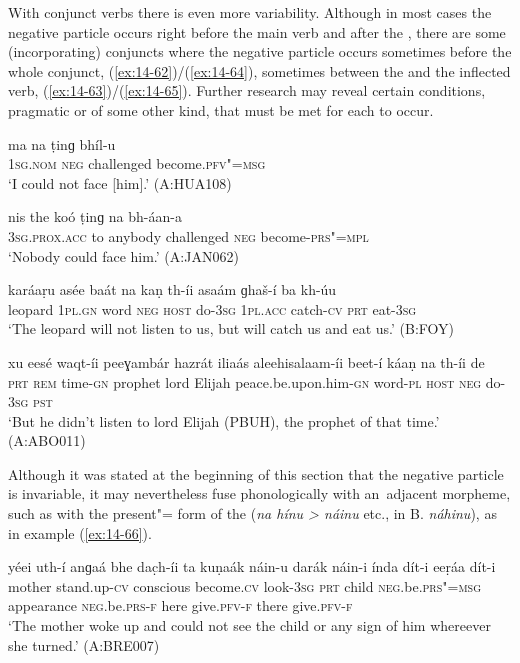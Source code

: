 With conjunct verbs there is even more variability. Although in most cases the negative particle occurs right before the main verb and after the , there are some (incorporating) conjuncts where the negative particle occurs sometimes before the whole conjunct, (\ref{ex:14-62})/(\ref{ex:14-64}), sometimes between the  and the inflected verb, (\ref{ex:14-63})/(\ref{ex:14-65}). Further research may reveal certain conditions, pragmatic or of some other kind, that must be met for each to occur. 

\begin{exe}
\ex
\label{ex:14-62}
\gll ma na ṭinɡ bhíl-u \\
\textsc{1sg.nom} \textsc{neg} challenged become.\textsc{pfv"=msg } \\
\glt `I could not face [him].' (A:HUA108)

\ex
\label{ex:14-63}
\gll nis the koó ṭinɡ na  bh-áan-a \\
\textsc{3sg.prox.acc} to anybody challenged \textsc{neg} become-\textsc{prs"=mpl } \\
\glt `Nobody could face him.' (A:JAN062)

\ex
\label{ex:14-64}
\gll karáaṛu asée baát na kaṇ th-íi asaám ɡhaš-í  ba kh-úu \\
leopard \textsc{1pl.gn} word \textsc{neg} \textsc{host} do-\textsc{3sg} \textsc{1pl.acc} catch-\textsc{cv}  \textsc{prt} eat-\textsc{3sg} \\
\glt `The leopard will not listen to us, but will catch us and eat us.' (B:FOY)

\ex
\label{ex:14-65}
\gll xu eesé waqt-íi peeɣambár hazrát iliaás aleehisalaam-íi  beet-í
káaṇ na th-íi  de \\
\textsc{prt} \textsc{rem} time-\textsc{gn} prophet lord  Elijah peace.be.upon.him-\textsc{gn} word-\textsc{pl} \textsc{host} \textsc{neg} do-\textsc{3sg} \textsc{pst} \\
\glt `But he didn't listen to lord Elijah (PBUH), the prophet of that time.' (A:ABO011)
\end{exe}

Although it was stated at the beginning of this section that the negative particle is invariable, it may nevertheless fuse phonologically with an~adjacent morpheme, such as with the present"= form of the  (\textit{na hínu {\textgreater} náinu} etc., in B. \textit{náhinu}), as in example (\ref{ex:14-66}).

\begin{exe}
\ex
\label{ex:14-66}
\gll yéei uth-í anɡaá bhe dac̣h-íi  ta kuṇaák náin-u darák náin-i  índa dít-i eeṛáa dít-i \\
mother stand.up-\textsc{cv} conscious become.\textsc{cv} look-\textsc{3sg}  \textsc{prt} child \textsc{neg.}be.\textsc{prs"=msg} appearance \textsc{neg.}be.\textsc{prs-f}  here give.\textsc{pfv-f} there give.\textsc{pfv-f} \\
\glt `The mother woke up and could not see the child or any sign of him whereever she turned.' (A:BRE007)
\end{exe}

